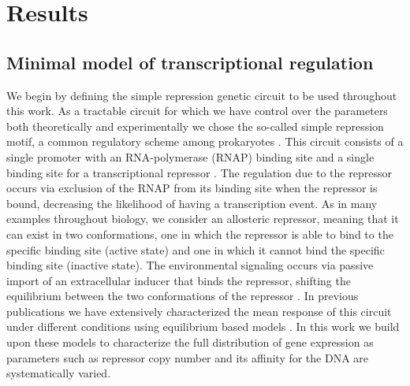 \section{Results}

\subsection{Minimal model of transcriptional regulation}\label{sec_model}

We begin by defining the simple repression genetic circuit to be used throughout
this work. As a tractable circuit for which we have control over the parameters
both theoretically and experimentally we chose the so-called simple  repression
motif, a common regulatory scheme among prokaryotes \cite{Rydenfelt2014}. This
circuit consists of a single promoter with an RNA-polymerase (RNAP) binding site
and a single binding site for a transcriptional repressor \cite{Garcia2011c}.
The regulation due to the repressor occurs via exclusion of the RNAP from its
binding site when the repressor is bound, decreasing the likelihood of having a
transcription event. As in many examples throughout biology, we consider an
allosteric repressor, meaning that it can exist in two conformations, one in
which the repressor is able to bind to the specific binding site (active state)
and one in which it cannot bind the specific binding site (inactive state). The
environmental signaling occurs via passive import of an extracellular inducer
that binds the repressor, shifting the equilibrium between the two conformations
of the repressor \cite{Razo-Mejia2018}. In previous publications we have
extensively characterized the mean response of this circuit under different
conditions using equilibrium based models . In this work
we build upon these models to characterize the full distribution of gene
expression as parameters such as repressor copy number and its affinity for the
DNA are systematically varied.

